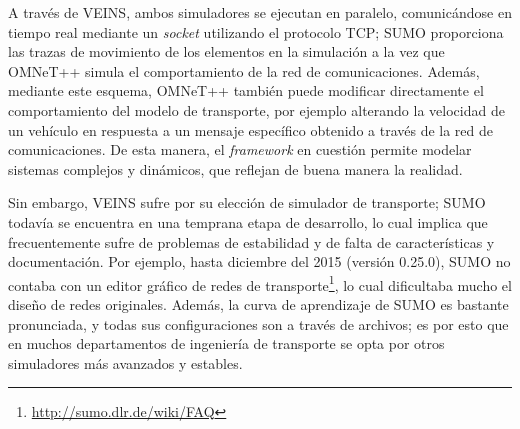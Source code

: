 A través de VEINS, ambos simuladores se ejecutan en paralelo, comunicándose en tiempo real mediante un \textit{socket} utilizando el protocolo TCP; SUMO proporciona las trazas de movimiento de los elementos en la simulación a la vez que OMNeT++ simula el comportamiento de la red de comunicaciones. Además, mediante este esquema, OMNeT++ también puede modificar directamente el comportamiento del modelo de transporte, por ejemplo alterando la velocidad de un vehículo en respuesta a un mensaje específico obtenido a través de la red de comunicaciones. De esta manera, el \textit{framework} en cuestión permite modelar sistemas complejos y dinámicos, que reflejan de buena manera la realidad.

Sin embargo, VEINS sufre por su elección de simulador de transporte; SUMO todavía se encuentra en una temprana etapa de desarrollo, lo cual implica que frecuentemente sufre de problemas de estabilidad y de falta de características y documentación. Por ejemplo, hasta diciembre del 2015 (versión 0.25.0), SUMO no contaba con un editor gráfico de redes de transporte\footnote{\url{http://sumo.dlr.de/wiki/FAQ}}, lo cual dificultaba mucho el diseño de redes originales. Además, la curva de aprendizaje de SUMO es bastante pronunciada, y todas sus configuraciones son a través de archivos; es por esto que en muchos departamentos de ingeniería de transporte se opta por otros simuladores más avanzados y estables.


